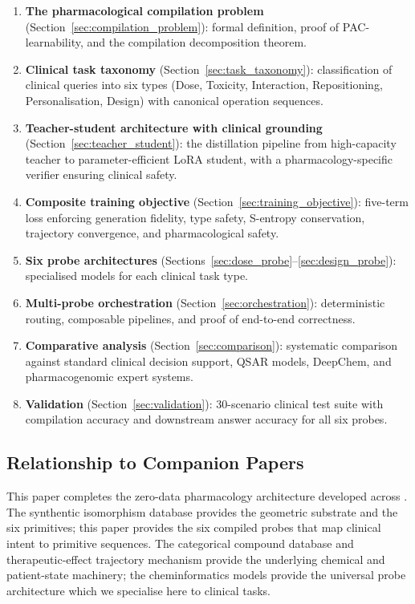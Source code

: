 \documentclass[11pt,twocolumn,a4paper]{article}
\theoremstyle{definition}
\theoremstyle{remark}
\begin{document}
\begin{enumerate}[nosep,leftmargin=*]
\item \textbf{The pharmacological compilation problem} (Section~\ref{sec:compilation_problem}): formal definition, proof of PAC-learnability, and the compilation decomposition theorem.

\item \textbf{Clinical task taxonomy} (Section~\ref{sec:task_taxonomy}): classification of clinical queries into six types (Dose, Toxicity, Interaction, Repositioning, Personalisation, Design) with canonical operation sequences.

\item \textbf{Teacher-student architecture with clinical grounding} (Section~\ref{sec:teacher_student}): the distillation pipeline from high-capacity teacher to parameter-efficient LoRA student, with a pharmacology-specific verifier ensuring clinical safety.

\item \textbf{Composite training objective} (Section~\ref{sec:training_objective}): five-term loss enforcing generation fidelity, type safety, S-entropy conservation, trajectory convergence, and pharmacological safety.

\item \textbf{Six probe architectures} (Sections~\ref{sec:dose_probe}--\ref{sec:design_probe}): specialised models for each clinical task type.

\item \textbf{Multi-probe orchestration} (Section~\ref{sec:orchestration}): deterministic routing, composable pipelines, and proof of end-to-end correctness.

\item \textbf{Comparative analysis} (Section~\ref{sec:comparison}): systematic comparison against standard clinical decision support, QSAR models, DeepChem, and pharmacogenomic expert systems.

\item \textbf{Validation} (Section~\ref{sec:validation}): 30-scenario clinical test suite with compilation accuracy and downstream answer accuracy for all six probes.
\end{enumerate}

\subsection{Relationship to Companion Papers}

This paper completes the zero-data pharmacology architecture developed across \citep{sachikonye2025a,sachikonye2025c,sachikonye2025d,sachikonye2025e,sachikonye2025f,sachikonye2025b}. The synthentic isomorphism database \citep{sachikonye2025e} provides the geometric substrate and the six primitives; this paper provides the six compiled probes that map clinical intent to primitive sequences. The categorical compound database \citep{sachikonye2025c} and therapeutic-effect trajectory mechanism \citep{sachikonye2025f} provide the underlying chemical and patient-state machinery; the cheminformatics models \citep{sachikonye2025d} provide the universal probe architecture which we specialise here to clinical tasks.
\end{document}
